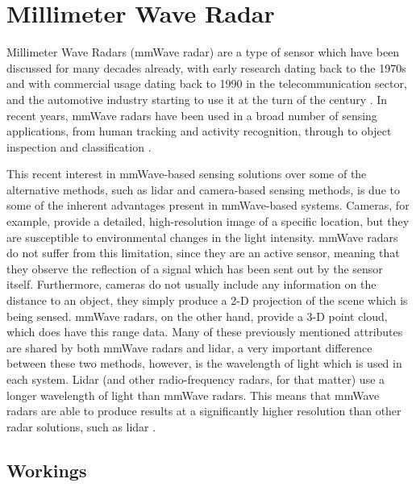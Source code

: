 \section{Millimeter Wave Radar}
\label{section: background - millimeter wave radar}

Millimeter Wave Radars (mmWave radar) are a type of sensor which have been discussed for many decades already, with early research dating back to the 1970s and with commercial usage dating back to 1990 in the telecommunication sector, and the automotive industry starting to use it at the turn of the century \cite{menzel2008years}.
In recent years, mmWave radars have been used in a broad number of sensing applications, from human tracking and activity recognition, through to object inspection and classification \cite[Fig.~2]{vanberlo2021millimeter}.

This recent interest in mmWave-based sensing solutions over some of the alternative methods, such as lidar and camera-based sensing methods, is due to some of the inherent advantages present in mmWave-based systems.
Cameras, for example, provide a detailed, high-resolution image of a specific location, but they are susceptible to environmental changes in the light intensity.
mmWave radars do not suffer from this limitation, since they are an active sensor, meaning that they observe the reflection of a signal which has been sent out by the sensor itself.
Furthermore, cameras do not usually include any information on the distance to an object, they simply produce a 2-D projection of the scene which is being sensed.
mmWave radars, on the other hand, provide a 3-D point cloud, which does have this range data.
Many of these previously mentioned attributes are shared by both mmWave radars and lidar, a very important difference between these two methods, however, is the wavelength of light which is used in each system. 
Lidar (and other radio-frequency radars, for that matter) use a longer wavelength of light than mmWave radars.
This means that mmWave radars are able to produce results at a significantly higher resolution than other radar solutions, such as lidar \cite{yan2025advancements}.

\subsection{Workings}
\label{subsection: background - millimeter wave radar - workings}

